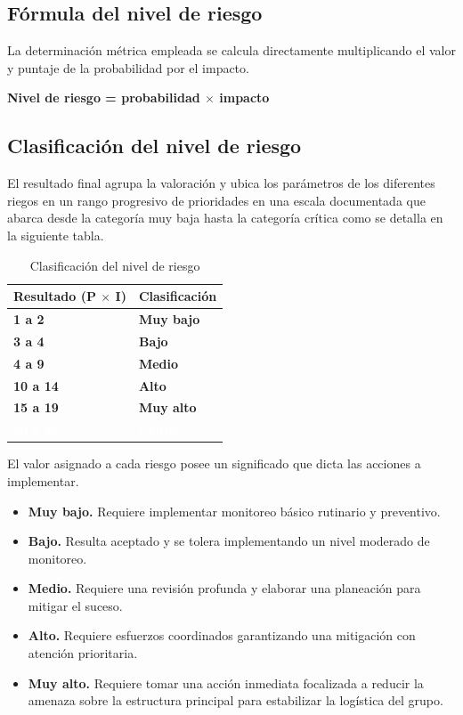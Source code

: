 \documentclass[11pt,spanish]{article}
\begin{document}
\subsection{Fórmula del nivel de riesgo}

La determinación métrica empleada se calcula directamente multiplicando el valor y puntaje de la probabilidad por el impacto.

\textbf{Nivel de riesgo = probabilidad $\times$ impacto}

\subsection{Clasificación del nivel de riesgo}

El resultado final agrupa la valoración y ubica los parámetros de los diferentes riegos en un rango progresivo de prioridades en una escala documentada que abarca desde la categoría muy baja hasta la categoría crítica como se detalla en la siguiente tabla.

\begin{table}[H]
\centering
\caption{Clasificación del nivel de riesgo}
\label{tab:clasificacion-riesgo}
\begin{tabularx}{0.6\textwidth}{X X}
\toprule
\textbf{Resultado (P $\times$ I)} & \textbf{Clasificación} \\
\midrule
\cellcolor{C_MuyBajo}\textbf{1 a 2} & \cellcolor{C_MuyBajo}\textbf{Muy bajo} \\
\cellcolor{C_Bajo}\textbf{3 a 4} & \cellcolor{C_Bajo}\textbf{Bajo} \\
\cellcolor{C_Medio}\textbf{4 a 9} & \cellcolor{C_Medio}\textbf{Medio} \\
\cellcolor{C_Alto}\textbf{10 a 14} & \cellcolor{C_Alto}\textbf{Alto} \\
\cellcolor{C_MuyAlto}\textbf{15 a 19} & \cellcolor{C_MuyAlto}\textbf{Muy alto} \\
\cellcolor{C_Critico}\textbf{\textcolor{white}{20 a 25}} & \cellcolor{C_Critico}\textbf{\textcolor{white}{Crítico}} \\
\bottomrule
\end{tabularx}
\end{table}

El valor asignado a cada riesgo posee un significado que dicta las acciones a implementar.

\begin{itemize}
    \item \textbf{Muy bajo.} Requiere implementar monitoreo básico rutinario y preventivo.
    \item \textbf{Bajo.} Resulta aceptado y se tolera implementando un nivel moderado de monitoreo.
    \item \textbf{Medio.} Requiere una revisión profunda y elaborar una planeación para mitigar el suceso.
    \item \textbf{Alto.} Requiere esfuerzos coordinados garantizando una mitigación con atención prioritaria.
    \item \textbf{Muy alto.} Requiere tomar una acción inmediata focalizada a reducir la amenaza sobre la estructura principal para estabilizar la logística del grupo.
\end{itemize}
\end{document}

